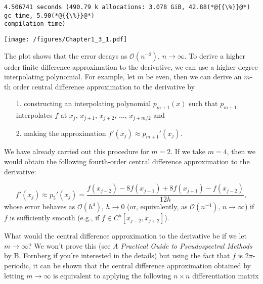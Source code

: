 \documentclass[12pt,landscape]{article}
\begin{document}
{\begin{lstlisting}
4.506741 seconds (490.79 k allocations: 3.078 GiB, 42.88(*@{{\%}}@*) gc time, 5.90(*@{{\%}}@*) 
compilation time)
\end{lstlisting}

\texttt{[image: /figures/Chapter1\_3\_1.pdf]}

The plot shows that the error decays as $\mathcal{O}(n^{-2})$, $n \to \infty$.
\newpage
To derive a higher order finite difference approximation to the derivative, we can use a higher degree interpolating polynomial.  For example, let $m$ be even, then we can derive an $m$-th order central difference approximation to the derivative by 

\begin{itemize}
\item[1. ] constructing an interpolating polynomial $p_{m+1}(x)$ such that $p_{m+1}$ interpolates $f$ at $x_j$, $x_{j\pm 1}$, $x_{j\pm 2}$, $\ldots$,  $x_{j\pm m/2}$ and 


\item[2. ] making the approximation $f'(x_j) \approx p_{m+1}'(x_j)$. 

\end{itemize}
We have already carried out this procedure for $m = 2$. If we take $m = 4$, then we would obtain the following fourth-order central difference approximation to the derivative:

\[
f'(x_j) \approx p_5'(x_j) = \frac{f(x_{j-2}) -8 f(x_{j-1}) + 8 f(x_{j+1}) - f(x_{j-2})}{12h},
\]
whose error behaves as $\mathcal{O}(h^4)$, $h \to 0$ (or, equivalently, as $\mathcal{O}(n^{-4})$, $n \to \infty$) if $f$ is sufficiently smooth (e.g., if $f \in C^5[x_{j-2}, x_{j+2}]$).

What would the central difference approximation to the derivative be if we let $m \to \infty$? We won't prove this (see \emph{A Practical Guide to Pseudospectral Methods} by B. Fornberg if you're interested in the details) but using the fact that $f$ is $2\pi$-periodic, it can be shown that the central difference approximation obtained by letting $m \to \infty$ is equivalent to applying the following $n \times n$ differentiation matrix

}
\end{document}
